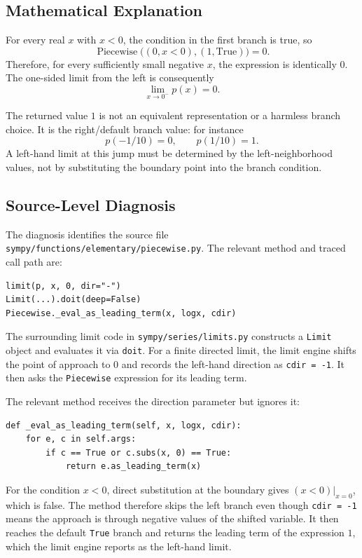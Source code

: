 \documentclass[11pt]{article}
\begin{document}
\subsection{Mathematical Explanation}

For every real \(x\) with \(x<0\), the condition in the first branch is true, so
\[
  \operatorname{Piecewise}\bigl((0,x<0),(1,\mathrm{True})\bigr)=0.
\]
Therefore, for every sufficiently small negative \(x\), the expression is
identically \(0\).  The one-sided limit from the left is consequently
\[
  \lim_{x\to 0^-} p(x)=0.
\]

The returned value \(1\) is not an equivalent representation or a harmless
branch choice.  It is the right/default branch value: for instance
\[
  p(-1/10)=0,\qquad p(1/10)=1.
\]
A left-hand limit at this jump must be determined by the left-neighborhood
values, not by substituting the boundary point into the branch condition.

\subsection{Source-Level Diagnosis}

The diagnosis identifies the source file
\nolinkurl{sympy/functions/elementary/piecewise.py}.  The relevant method and
traced call path are:

\begin{lstlisting}[style=bugpython]
limit(p, x, 0, dir="-")
Limit(...).doit(deep=False)
Piecewise._eval_as_leading_term(x, logx, cdir)
\end{lstlisting}

The surrounding limit code in \nolinkurl{sympy/series/limits.py} constructs a
\texttt{Limit} object and evaluates it via \texttt{doit}.  For a finite
directed limit, the limit engine shifts the point of approach to \(0\) and
records the left-hand direction as \texttt{cdir = -1}.  It then asks the
\texttt{Piecewise} expression for its leading term.

The relevant method receives the direction parameter but ignores it:

\begin{lstlisting}[style=bugpython]
def _eval_as_leading_term(self, x, logx, cdir):
    for e, c in self.args:
        if c == True or c.subs(x, 0) == True:
            return e.as_leading_term(x)
\end{lstlisting}

For the condition \(x<0\), direct substitution at the boundary gives
\((x<0)\rvert_{x=0}\), which is false.  The method therefore skips the left
branch even though \texttt{cdir = -1} means the approach is through negative
values of the shifted variable.  It then reaches the default \texttt{True}
branch and returns the leading term of the expression \(1\), which the limit
engine reports as the left-hand limit.
\end{document}
